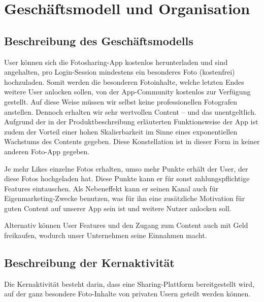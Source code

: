 \chapter{Geschäftsmodell und Organisation}


\section{Beschreibung des Geschäftsmodells}

User können sich die Fotosharing-App kostenlos herunterladen und sind angehalten, pro Login-Session mindestens ein besonderes Foto (kostenfrei) hochzuladen. Somit werden die besonderen Fotoinhalte, welche letzten Endes weitere User anlocken sollen, von der App-Community kostenlos zur Verfügung gestellt. Auf diese Weise müssen wir selbst keine professionellen Fotografen anstellen. Dennoch erhalten wir sehr wertvollen Content – und das unentgeltlich. Aufgrund der in der Produktbeschreibung erläuterten Funktionsweise der App ist zudem der Vorteil einer hohen Skalierbarkeit im Sinne eines exponentiellen Wachstums des Contents gegeben. Diese Konstellation ist in dieser Form in keiner anderen Foto-App gegeben.

Je mehr Likes einzelne Fotos erhalten, umso mehr Punkte erhält der User, der diese Fotos hochgeladen hat. Diese Punkte kann er für sonst zahlungspflichtige Features eintauschen. Als Nebeneffekt kann er seinen Kanal auch für Eigenmarketing-Zwecke benutzen, was für ihn eine zusätzliche Motivation für guten Content auf unserer App sein ist und weitere Nutzer anlocken soll.

Alternativ können User Features und den Zugang zum Content auch mit Geld freikaufen, wodurch unser Unternehmen seine Einnahmen macht.


\section{Beschreibung der Kernaktivität}
Die Kernaktivität besteht darin, dass eine Sharing-Plattform bereitgestellt wird, auf der ganz besondere Foto-Inhalte von privaten Usern geteilt werden können.



